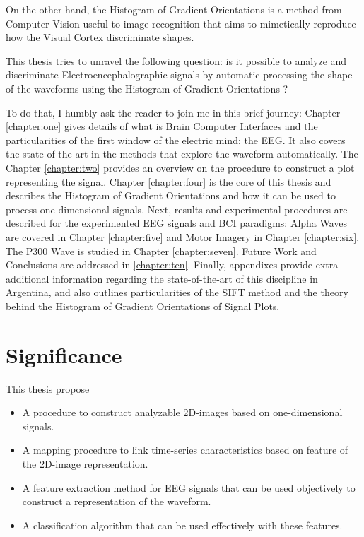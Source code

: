 On the other hand, the Histogram of Gradient Orientations is a method from Computer Vision useful to image recognition that aims to mimetically reproduce how the Visual Cortex discriminate shapes.

This thesis tries to unravel the following question:  is it possible to analyze and discriminate Electroencephalographic signals by automatic processing the shape of the waveforms using the Histogram of Gradient Orientations ?

To do that, I humbly ask the reader to join me in this brief journey:  Chapter  \ref{chapter:one} gives details of what is Brain Computer Interfaces and the particularities of the first window of the electric mind: the EEG. It also covers the state of the art in the methods that explore the waveform automatically.  The Chapter \ref{chapter:two} provides an overview on the procedure to construct a plot representing the signal. Chapter \ref{chapter:four} is the core of this thesis and describes the Histogram of Gradient Orientations and how it can be used to process one-dimensional signals.
Next, results and experimental procedures are described for the experimented EEG signals and  BCI paradigms:  Alpha Waves are covered in Chapter \ref{chapter:five} and Motor Imagery in Chapter \ref{chapter:six}. The P300 Wave is studied in Chapter \ref{chapter:seven}.  Future Work and Conclusions are addressed in \ref{chapter:ten}.  Finally, appendixes provide extra additional information regarding the state-of-the-art of this discipline in Argentina, and also outlines particularities of the SIFT method and the theory behind the Histogram of Gradient Orientations of Signal Plots.

\section{Significance}

This thesis propose

\begin{itemize}
\item A procedure to construct analyzable 2D-images based on one-dimensional signals.
\item A mapping procedure to link time-series characteristics based on feature of the 2D-image representation.
\item A feature extraction method for EEG signals that can be used objectively to construct a representation of the waveform.
\item A classification algorithm that can be used effectively with these features.
\end{itemize}

